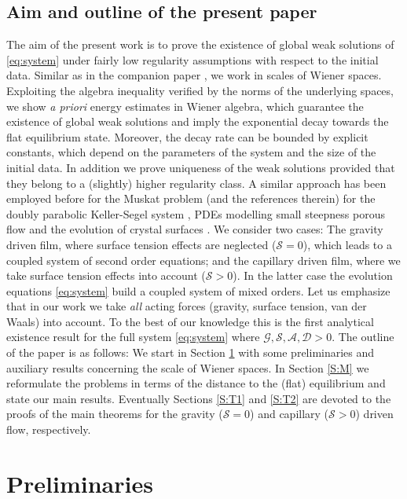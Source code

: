 \documentclass[reqno,11pt]{amsart}
\begin{document}
\subsection{Aim and outline of the present paper}
The aim of the present work is to prove the existence of global weak solutions of \eqref{eq:system} under fairly low regularity assumptions with respect to the initial data. Similar as in the companion paper \cite{BG18}, we work in scales of Wiener spaces. Exploiting the algebra inequality verified by the norms of the underlying spaces, we show \emph{a priori} energy estimates in Wiener algebra, which guarantee the existence of global weak solutions and imply the exponential decay towards the flat equilibrium state. Moreover, the decay rate can be bounded by explicit constants, which depend on the parameters of the system and the size of the initial data. In addition we prove uniqueness of the weak solutions provided that they belong to a (slightly) higher regularity class. A similar approach has been employed before for the Muskat problem \cite{gan1,gan2,gan3} (and the references therein) for the doubly parabolic Keller-Segel system \cite{burczak2016generalized}, PDEs modelling small steepness porous flow \cite{granero2018asymptotic} and the evolution of crystal surfaces \cite{granero2019global}. We consider two cases: The gravity driven film, where surface tension effects are neglected ($\mathcal S =0$), which leads to a coupled system of second order equations; and the capillary driven film, where we take surface tension effects into account ($\mathcal S>0$). In the latter case the evolution equations \eqref{eq:system} build a coupled system of mixed orders. Let us emphasize that in our work we take \emph{all} acting forces (gravity, surface tension, van der Waals) into account. To the best of our knowledge this is the first analytical existence result for the full system \eqref{eq:system} where $\mathcal G,\mathcal S,\mathcal A,\mathcal D>0$. The outline of the paper is as follows: We start in Section \ref{S:P} with some preliminaries and auxiliary results concerning the scale of Wiener spaces. In Section \ref{S:M} we reformulate the problems in terms of the distance to the (flat) equilibrium and state our main results. Eventually Sections \ref{S:T1} and \ref{S:T2} are devoted to the proofs of the main theorems for the gravity ($\mathcal S=0$) and capillary ($\mathcal S>0$) driven flow, respectively.


\section{Preliminaries}\label{S:P}
\end{document}
